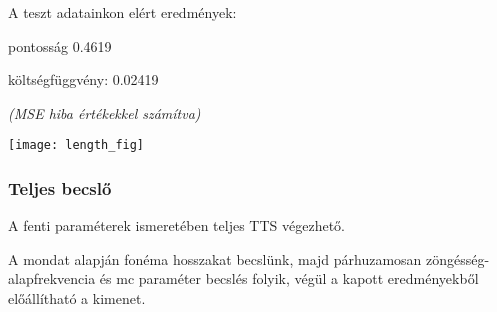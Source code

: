 \begin{minipage}{0.5\textwidth}	
	A teszt adatainkon elért eredmények:
	
	pontosság 0.4619
	
	költségfüggvény: 0.02419
	
	\textit{(MSE hiba értékekkel számítva)}
\end{minipage}
\begin{minipage}{0.5\textwidth}
	\flushright	
	\texttt{[image: length\_fig]}
\end{minipage}

\subsubsection{Teljes becslő}
A fenti paraméterek ismeretében teljes TTS végezhető. 

A mondat alapján fonéma hosszakat becslünk, majd párhuzamosan zöngésség-alapfrekvencia és mc paraméter becslés folyik, végül a kapott eredményekből előállítható a kimenet.